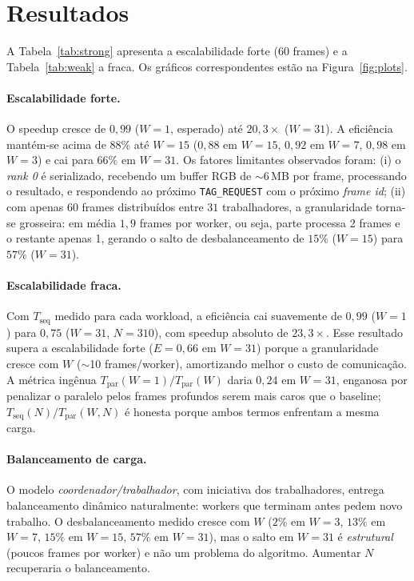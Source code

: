 \documentclass[twocolumn,a4paper,10pt]{article}
\begin{document}
\section{Resultados}
A Tabela~\ref{tab:strong} apresenta a escalabilidade forte (60 frames) e a Tabela~\ref{tab:weak} a fraca. Os gráficos correspondentes estão na Figura~\ref{fig:plots}.

\paragraph{Escalabilidade forte.} O speedup cresce de $0{,}99$ ($W{=}1$, esperado) até $20{,}3\times$ ($W{=}31$). A eficiência mantém-se acima de $88\%$ até $W{=}15$ ($0{,}88$ em $W{=}15$, $0{,}92$ em $W{=}7$, $0{,}98$ em $W{=}3$) e cai para $66\%$ em $W{=}31$. Os fatores limitantes observados foram: (i) o \emph{rank 0} é serializado, recebendo um buffer RGB de $\sim$6\,MB por frame, processando o resultado, e respondendo ao próximo \texttt{TAG\_REQUEST} com o próximo \emph{frame id}; (ii) com apenas $60$ frames distribuídos entre $31$ trabalhadores, a granularidade torna-se grosseira: em média $1{,}9$ frames por worker, ou seja, parte processa 2 frames e o restante apenas 1, gerando o salto de desbalanceamento de $15\%$ ($W{=}15$) para $57\%$ ($W{=}31$).

\paragraph{Escalabilidade fraca.} Com $T_{\text{seq}}$ medido para cada workload, a eficiência cai suavemente de $0{,}99$ ($W{=}1$) para $0{,}75$ ($W{=}31$, $N{=}310$), com speedup absoluto de $23{,}3\times$. Esse resultado supera a escalabilidade forte ($E{=}0{,}66$ em $W{=}31$) porque a granularidade cresce com $W$ ($\sim$10 frames/worker), amortizando melhor o custo de comunicação. A métrica ingênua $T_{\text{par}}(W{=}1)/T_{\text{par}}(W)$ daria $0{,}24$ em $W{=}31$, enganosa por penalizar o paralelo pelos frames profundos serem mais caros que o baseline; $T_{\text{seq}}(N)/T_{\text{par}}(W,N)$ é honesta porque ambos termos enfrentam a mesma carga.

\paragraph{Balanceamento de carga.} O modelo \emph{coordenador/trabalhador}, com iniciativa dos trabalhadores, entrega balanceamento dinâmico naturalmente: workers que terminam antes pedem novo trabalho. O desbalanceamento medido cresce com $W$ ($2\%$ em $W{=}3$, $13\%$ em $W{=}7$, $15\%$ em $W{=}15$, $57\%$ em $W{=}31$), mas o salto em $W{=}31$ é \emph{estrutural} (poucos frames por worker) e não um problema do algoritmo. Aumentar $N$ recuperaria o balanceamento.
\end{document}
